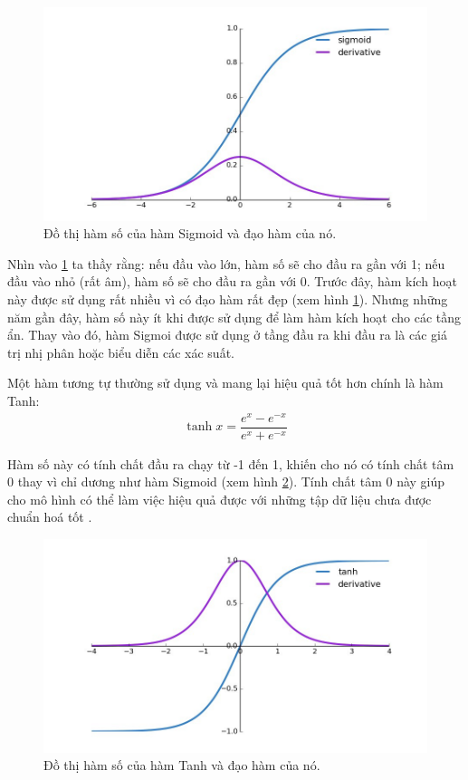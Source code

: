 \begin{figure}[!h]
\captionsetup{width=0.8\textwidth}
\centering
\includegraphics[width=15cm]{images/sigmoidfunc.jpg}
\caption{Đồ thị hàm số của hàm Sigmoid và đạo hàm của nó.}
\label{fig:sigmoidfunc}
\end{figure}

Nhìn vào \ref{fig:sigmoidfunc} ta thầy rằng: nếu đầu vào lớn, hàm số sẽ cho đầu ra gần với 1;
nếu đầu vào nhỏ (rất âm), hàm số sẽ cho đầu ra gần với 0.
Trước đây, hàm kích hoạt này được sử dụng rất nhiều vì có đạo hàm rất đẹp (xem hình \ref{fig:sigmoidfunc}).
Nhưng những năm gần đây, hàm số này ít khi được sử dụng để làm hàm kích hoạt cho các tầng ẩn.
Thay vào đó, hàm Sigmoi được sử dụng ở tầng đầu ra khi đầu ra là các giá trị nhị phân hoặc biểu diễn các xác suất.
\vspace{5pt}

Một hàm tương tự thường sử dụng và mang lại hiệu quả tốt hơn chính là hàm Tanh:
\begin{align}
    \tanh{x} = \dfrac{e^x - e^{-x}}{e^x + e^{-x}}
\end{align}

Hàm số này có tính chất đầu ra chạy từ -1 đến 1, khiến cho nó có tính chất tâm 0 thay vì chỉ dương như hàm Sigmoid (xem hình \ref{fig:tanhfunc}).
Tính chất tâm 0 này giúp cho mô hình có thể làm việc hiệu quả được với những tập dữ liệu chưa được chuẩn hoá tốt \cite{zerocenteredstat}.
\vspace{5pt}

\begin{figure}[!h]
\captionsetup{width=0.8\textwidth}
\centering
\includegraphics[width=15cm]{images/tanhfunc.jpg}
\caption{Đồ thị hàm số của hàm Tanh và đạo hàm của nó.}
\label{fig:tanhfunc}
\end{figure}

